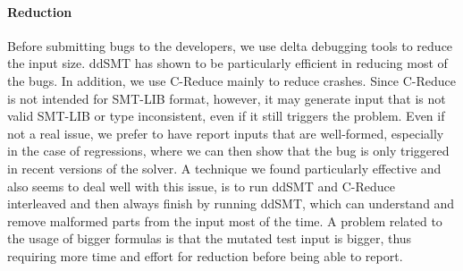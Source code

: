 \documentclass[sigplan,screen]{acmart}
\begin{document}
\paragraph{Reduction}
Before submitting bugs to the developers, we use delta debugging tools to reduce the input size. ddSMT \cite{DDSMT}
has shown to be particularly efficient in reducing most of the bugs. In addition, we use C-Reduce \cite{CREDUCE}
mainly to reduce crashes. Since C-Reduce is not intended for SMT-LIB format, however, it may generate input that is not valid SMT-LIB or type inconsistent, even if it still triggers the problem. Even if not a real issue, we prefer to have report inputs that are well-formed, especially in the case of regressions, where we can then show that the bug is only triggered in recent versions of the solver. A technique we found particularly effective and also seems to deal well with this issue, is to run ddSMT and C-Reduce interleaved and then always finish by running ddSMT, which can understand and remove malformed parts from the input most of the time.
A problem related to the usage of bigger formulas is that the mutated test input is bigger, thus requiring more time and effort for reduction before being able to report.
\end{document}

